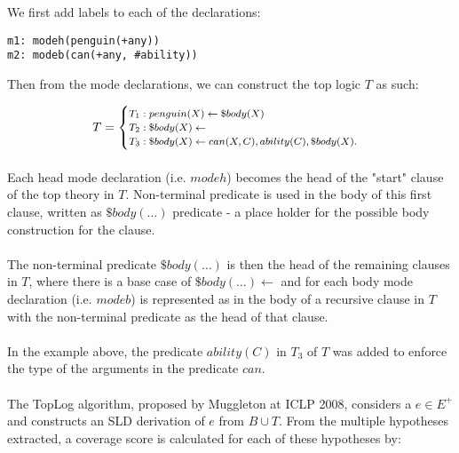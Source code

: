 \documentclass{article}
\theoremstyle{plain}
\theoremstyle{definition}
\begin{document}
\begin{multicols}{2}
\noindent We first add labels to each of the declarations:

\begin{lstlisting}
m1: modeh(penguin(+any))
m2: modeb(can(+any, #ability))
\end{lstlisting}

\noindent Then from the mode declarations, we can construct the top logic $T$ as such:

\[\footnotesize
T = \begin{cases}
T_1: penguin(X) \leftarrow \$body(X)\\
T_2: \$body(X) \leftarrow\\
T_3: \$body(X) \leftarrow can(X, C), ability(C), \$body(X).
\end{cases}
\]

\paragraph{} Each head mode declaration (i.e. $modeh$) becomes the head of the "start" clause of the top theory in $T$. Non-terminal predicate is used in the body of this first clause, written as $\$body(\dots)$ predicate - a place holder for the possible body construction for the clause.

\paragraph{} The non-terminal predicate $\$body(\dots)$ is then the head of the remaining clauses in $T$, where there is a base case of $\$body(\dots) \leftarrow$ and for each body mode declaration (i.e. $modeb$) is represented as in the body of a recursive clause in $T$ with the non-terminal predicate as the head of that clause.

\paragraph{} In the example above, the predicate $ability(C)$ in $T_3$ of $T$ was added to enforce the type of the arguments in the predicate $can$.

\paragraph{} The TopLog algorithm, proposed by Muggleton at ICLP 2008, considers a $e \in E^+$ and constructs an SLD derivation of $e$ from $B \cup T$. From the multiple hypotheses extracted, a coverage score is calculated for each of these hypotheses by:


\end{multicols}
\end{document}
